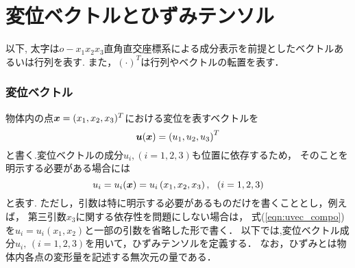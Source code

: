 \documentclass[10pt,a4j]{jbook}
\newlength{\minitwocolumn}
\begin{document}
\newcommand{\fat}[1]{\mbox{\boldmath $#1$}}
\newcommand{\D}{\partial}
\newcommand{\w}{\omega}
\newcommand{\ga}{\alpha}
\newcommand{\gb}{\beta}
\newcommand{\gx}{\xi}
\newcommand{\gz}{\zeta}
\newcommand{\vhat}[1]{\hat{\fat{#1}}}
\newcommand{\spc}{\vspace{0.7\baselineskip}}
\newcommand{\halfspc}{\vspace{0.3\baselineskip}}

\newcommand{\twofig}[2]
 {
   \begin{figure}
     \begin{minipage}[t]{\minitwocolumn}
         \begin{center}   #1
         \end{center}
     \end{minipage}
         \hspace{\columnsep}
     \begin{minipage}[t]{\minitwocolumn}
         \begin{center} #2
         \end{center}
     \end{minipage}
   \end{figure}
 }
\setcounter{chapter}{2}
\chapter{変位ベクトルとひずみテンソル}
以下, 太字は$o-x_1x_2x_3$直角直交座標系による成分表示を前提としたベクトルあるいは行列を表す.
また，$(\cdot)^T$は行列やベクトルの転置を表す．
\subsection{変位ベクトル}
物体内の点$\fat{x}=(x_1,x_2,x_3)^T$における変位を表すベクトルを
\begin{equation}
	\fat{u}(\fat{x})=\left( u_1, u_2, u_3 \right)^T
	\label{eqn:uvec}
\end{equation}
と書く.変位ベクトルの成分$u_i,(i=1,2,3)$も位置に依存するため，
そのことを明示する必要がある場合には
\begin{equation}
	u_i=u_i(\fat{x})=u_i\left(x_1, x_2, x_3\right), \ \ (i=1,2,3)
	\label{eqn:uvec_compo}
\end{equation}
と表す.
ただし，引数は特に明示する必要があるものだけを書くこととし，例えば，
第三引数$x_3$に関する依存性を問題にしない場合は，
式(\ref{eqn:uvec_compo})を$u_i=u_i(x_1,x_2)$と一部の引数を省略した形で書く．
以下では,変位ベクトル成分$u_i,\,(i=1,2,3)$を用いて，ひずみテンソルを定義する．
なお，ひずみとは物体内各点の変形量を記述する無次元の量である．
%
\end{document}
